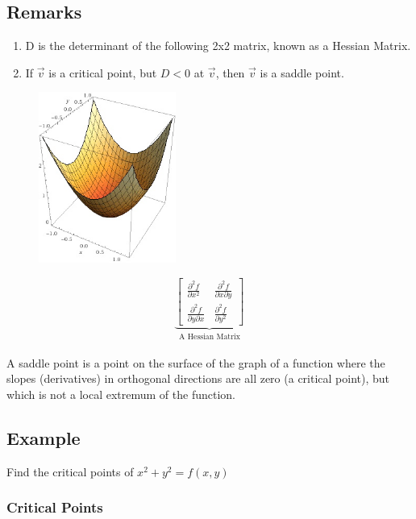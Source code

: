 \documentclass{article}
\begin{document}
\subsection*{Remarks}
\begin{enumerate}
    \item D is the determinant of the following 2x2 matrix, known as a Hessian Matrix.
    \item If $\vec{v}$ is a critical point, but $D<0$ at $\vec{v}$, then $\vec{v}$ is a saddle point.
\end{enumerate}
\begin{figure}
    \begin{center}
      \includegraphics[width=0.40\textwidth]{graph1.jpg}
    \end{center}
  \end{figure}
\[\underbrace{\begin{bmatrix}
    \frac{\partial^2 f}{\partial x^2}& \frac{\partial^2 f}{\partial x \partial y}\\
    \frac{\partial^2 f}{\partial y \partial x}& \frac{\partial^2 f}{\partial y^2}
\end{bmatrix}}_{\mbox{A Hessian Matrix}}\]\\

A saddle point is a point on the surface of the graph of a function where the slopes (derivatives) in orthogonal directions are all zero (a critical point), but which is not a local extremum of the function.

\subsection*{Example}

Find the critical points of $x^2+y^2=f(x,y)$
\subsubsection*{Critical Points}
\end{document}
